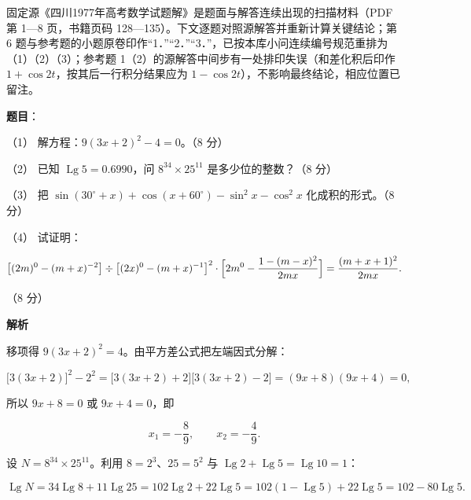 

\begin{gktip}
固定源《四川1977年高考数学试题解》是题面与解答连续出现的扫描材料（PDF 第 1—8 页，书籍页码 128—135）。下文逐题对照源解答并重新计算关键结论；第 6 题与参考题的小题原卷印作“1．”“2．”“3．”，已按本库小问连续编号规范重排为（1）（2）（3）；参考题 1（2）的源解答中间步有一处排印失误（和差化积后印作 $1+\cos2t$，按其后一行积分结果应为 $1-\cos2t$），不影响最终结论，相应位置已留注。
\end{gktip}

\begin{answer}

\textbf{题目}：

（1） 解方程：$9(3x+2)^2-4=0$。（8 分）

（2） 已知 $\operatorname{Lg}5=0.6990$，问 $8^{34}\times25^{11}$ 是多少位的整数？（8 分）

（3） 把 $\sin(30^\circ+x)+\cos(x+60^\circ)-\sin^2x-\cos^2x$ 化成积的形式。（8 分）

（4） 试证明：

\nopagebreak[4]
\[
\bigl[(2m)^0-(m+x)^{-2}\bigr]\div\bigl[(2x)^0-(m+x)^{-1}\bigr]^2\cdot\Bigl[2m^0-\frac{1-(m-x)^2}{2mx}\Bigr]=\frac{(m+x+1)^2}{2mx}.
\]

（8 分）

\textbf{解析}


移项得 $9(3x+2)^2=4$。由平方差公式把左端因式分解：

\nopagebreak[4]
\[
\bigl[3(3x+2)\bigr]^2-2^2=\bigl[3(3x+2)+2\bigr]\bigl[3(3x+2)-2\bigr]=(9x+8)(9x+4)=0,
\]

所以 $9x+8=0$ 或 $9x+4=0$，即

\nopagebreak[4]
\[
x_1=-\frac89,\qquad x_2=-\frac49.
\]


设 $N=8^{34}\times25^{11}$。利用 $8=2^3$、$25=5^2$ 与 $\operatorname{Lg}2+\operatorname{Lg}5=\operatorname{Lg}10=1$：

\nopagebreak[4]
\[
\operatorname{Lg}N=34\operatorname{Lg}8+11\operatorname{Lg}25
=102\operatorname{Lg}2+22\operatorname{Lg}5
=102(1-\operatorname{Lg}5)+22\operatorname{Lg}5
=102-80\operatorname{Lg}5.
\]


\end{answer}
